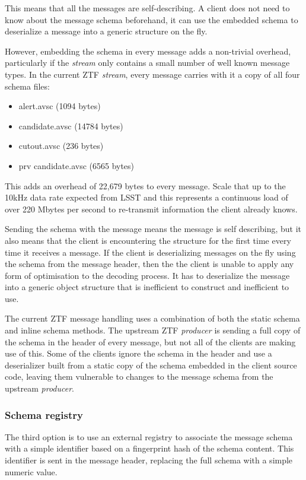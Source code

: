 \documentclass{article}
\newcommand{\kfstream} {\textit{stream}\xspace}
\newcommand{\kfproducer} {\textit{producer}\xspace}
\newcommand{\deserz}    {deserialize\xspace}
\newcommand{\deserzer}  {deserializer\xspace}
\newcommand{\deserzing} {deserializing\xspace}
\begin{document}
This means that all the messages are self-describing. A client does not need to know about the message schema beforehand, it can use the embedded schema to \deserz a message into a generic structure on the fly.

However, embedding the schema in every message adds a non-trivial overhead, particularly if the \kfstream only contains a small number of well known message types.
In the current ZTF \kfstream, every message carries with it a copy of all four schema files:

\begin{itemize}
  \item alert.avsc (1094 bytes)
  \item candidate.avsc (14784 bytes)
  \item cutout.avsc (236 bytes)
  \item prv candidate.avsc (6565 bytes)
\end{itemize}

This adds an overhead of 22,679 bytes to every message. Scale that up to the 10kHz data rate expected from LSST and this represents a continuous load of over 220 Mbytes per second to re-transmit information the client already knows.

Sending the schema with the message means the message is self describing, but it also means that the client is encountering the structure for the first time every time it receives a message. If the client is \deserzing messages on the fly using the schema from the message header, then the the client is unable to apply any form of optimisation to the decoding process. It has to \deserz the message into a generic object structure that is inefficient to construct and inefficient to use.

The current ZTF message handling uses a combination of both the static schema and inline schema methods.
The upstream ZTF \kfproducer is sending a full copy of the schema in the header of every message, but not all of the clients are making use of this. 
Some of the clients ignore the schema in the header and use a \deserzer built from a static copy of the schema embedded in the client source code, leaving them vulnerable to changes to the message schema from the upstream \kfproducer.

\subsubsection{Schema registry}
\label{avro-schema-registry}

The third option is to use an external registry to associate the message schema with a simple identifier based on a fingerprint hash of the schema content. This identifier is sent in the message header, replacing the full schema with a simple numeric value.
\end{document}
